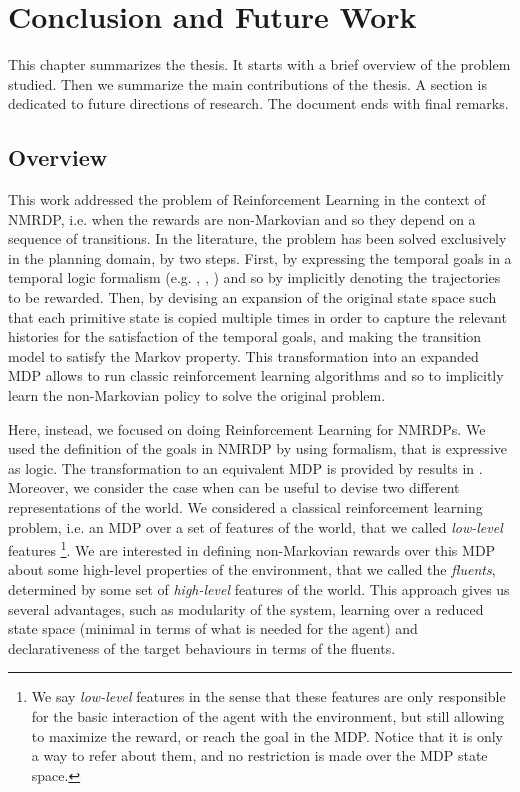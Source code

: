 \chapter{Conclusion and Future Work}\label{ch:conclusions}
This chapter summarizes the thesis. It starts with a brief overview of the problem studied. Then we summarize the main contributions of the thesis. A section is dedicated to future directions of research. The document ends with final remarks.
\section{Overview}
This work addressed the problem of Reinforcement Learning in the context of NMRDP, i.e. when the rewards are non-Markovian and so they depend on a sequence of transitions. In the literature, the problem has been solved exclusively in the planning domain, by two steps. First, by expressing the temporal goals in a temporal logic formalism (e.g. \PLTL, \FLTL, \LTLf) and so by implicitly denoting the trajectories to be rewarded. Then, by devising an expansion of the original state space such that each primitive state is copied multiple times in order to capture the relevant histories for the satisfaction of the temporal goals, and making the transition model to satisfy the Markov property. This transformation into an expanded MDP allows to run classic reinforcement learning algorithms and so to implicitly learn the non-Markovian policy to solve the original problem.

Here, instead, we focused on doing Reinforcement Learning for NMRDPs.
We used the definition of the goals in NMRDP by using \LDLf formalism, that is expressive as \MSO logic. The transformation to an equivalent MDP is provided by results in \citep{AAAI1817342}. Moreover, we consider the case when can be useful to devise two different representations of the world. We considered a classical reinforcement learning problem, i.e. an MDP over a set of features of the world, that we called \emph{low-level} features
\footnote{We say \emph{low-level} features in the sense that these features are only responsible for the basic interaction of the agent with the environment, but still allowing to maximize the reward, or reach the goal in the MDP. Notice that it is only a way to refer about them, and no restriction is made over the MDP state space.}.
We are interested in defining non-Markovian rewards over this MDP about some high-level properties of the environment, that we called the \emph{fluents}, determined by some set of \emph{high-level} features of the world. This approach gives us several advantages, such as modularity of the system, learning over a reduced state space (minimal in terms of what is needed for the agent) and declarativeness of the target behaviours in terms of the fluents.

